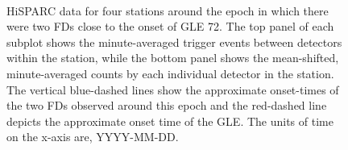 \begin{figure}[ht!]
	\centering
	 \\
	
	\qquad
	
	
	\caption{HiSPARC data for four stations around the epoch in which there were two FDs close to the onset of GLE 72. The top panel of each subplot shows the minute-averaged trigger events between detectors within the station, while the bottom panel shows the mean-shifted, minute-averaged counts by each individual detector in the station. The vertical blue-dashed lines show the approximate onset-times of the two FDs observed around this epoch and the red-dashed line depicts the approximate onset time of the GLE. The units of time on the x-axis are, YYYY-MM-DD.}
	\label{fig:FD_GLE72}
\end{figure}

